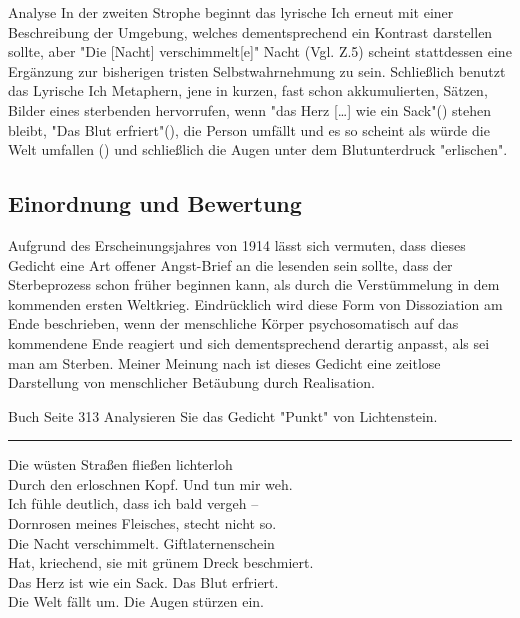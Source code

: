 \documentclass[11pt,a4paper,oneside]{article}
\begin{document}
\begin{loesung}{Analyse}
		In der zweiten Strophe beginnt das lyrische Ich erneut mit einer Beschreibung der Umgebung, welches dementsprechend ein Kontrast darstellen sollte, aber "Die [Nacht] verschimmelt[e]" Nacht (Vgl. Z.5) scheint stattdessen eine Ergänzung zur bisherigen tristen Selbstwahrnehmung zu sein. Schließlich benutzt das Lyrische Ich Metaphern, jene in kurzen, fast schon akkumulierten, Sätzen, Bilder eines sterbenden hervorrufen, wenn "das Herz […] wie ein Sack"() stehen bleibt, "Das Blut erfriert"(), die Person umfällt und es so scheint als würde die Welt umfallen () und schließlich die Augen unter dem Blutunterdruck "erlischen".
		
		\subsection*{Einordnung und Bewertung}
		Aufgrund des Erscheinungsjahres von 1914 lässt sich vermuten, dass dieses Gedicht eine Art offener Angst-Brief an die lesenden sein sollte, dass der Sterbeprozess schon früher beginnen kann, als durch die Verstümmelung in dem kommenden ersten Weltkrieg. Eindrücklich wird diese Form von Dissoziation am Ende beschrieben, wenn der menschliche Körper psychosomatisch auf das kommendene Ende reagiert und sich dementsprechend derartig anpasst, als sei man am Sterben. Meiner Meinung nach ist dieses Gedicht eine zeitlose Darstellung von menschlicher Betäubung durch Realisation.  
	\end{loesung}	
	
	\newpage
	
	\begin{aufgabe}{Buch Seite 313}
		Analysieren Sie das Gedicht "Punkt" von Lichtenstein.\\
		\hrule
		\vspace{5mm}
		Die wüsten Straßen fließen lichterloh\\
		Durch den erloschnen Kopf. Und tun mir weh.\\
		Ich fühle deutlich, dass ich bald vergeh –\\
		Dornrosen meines Fleisches, stecht nicht so.\\
		
		Die Nacht verschimmelt. Giftlaternenschein\\
		Hat, kriechend, sie mit grünem Dreck beschmiert.\\
		Das Herz ist wie ein Sack. Das Blut erfriert.\\
		Die Welt fällt um. Die Augen stürzen ein.\\
	\end{aufgabe}
	\vspace{1cm}
	
\end{document}

